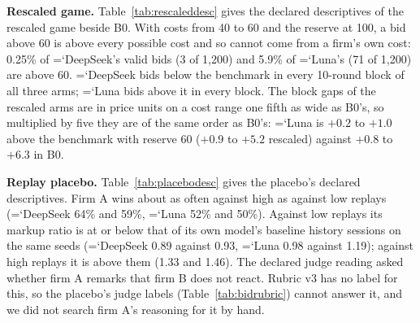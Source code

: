 \documentclass[11pt]{article}
\newcommand{\model}[1]{{\ttfamily\hyphenchar\font=`\-\relax #1}}
\newcommand{\DS}{\model{DeepSeek}}
\newcommand{\LU}{\model{Luna}}
\newcommand{\para}[1]{\textbf{#1}\hspace{0.4em}}
\begin{document}
\para{Rescaled game.} Table~\ref{tab:rescaleddesc} gives the declared descriptives of the rescaled game beside \textcolor{cB}{B0}. With costs from 40 to 60 and the reserve at 100, a bid above 60 is above every possible cost and so cannot come from a firm's own cost: 0.25\% of \DS's valid bids (3 of 1{,}200) and 5.9\% of \LU's (71 of 1{,}200) are above 60. \DS{} bids below the benchmark in every 10-round block of all three arms; \LU{} bids above it in every block. The block gaps of the rescaled arms are in price units on a cost range one fifth as wide as \textcolor{cB}{B0}'s, so multiplied by five they are of the same order as \textcolor{cB}{B0}'s: \LU{} is $+0.2$ to $+1.0$ above the benchmark with reserve 60 ($+0.9$ to $+5.2$ rescaled) against $+0.8$ to $+6.3$ in \textcolor{cB}{B0}.

\begin{table}[t]
\centering\small
\caption{Declared descriptives of the rescaled game beside \textcolor{cB}{B0} (means over 12 sessions). \textbf{$>$60 \%}: \% of valid bids above 60 (reserve-100 arm only); \textbf{Gap}: mean distance of bids from the benchmark bid, in price units; \textbf{Reserve \%}, \textbf{Below cost \%}: \% of bids at the reserve and below cost; \textbf{Ties \%}: \% of rounds with tied lowest bids; then the mean bid minus the benchmark bid by 10-round block. Price units in the rescaled arms are on a cost range of 20, against 100 in \textcolor{cB}{B0}.}
\label{tab:rescaleddesc}
\setlength{\tabcolsep}{3.5pt}
\end{table}

\para{Replay placebo.} Table~\ref{tab:placebodesc} gives the placebo's declared descriptives. Firm A wins about as often against high as against low replays (\DS{} 64\% and 59\%, \LU{} 52\% and 50\%). Against low replays its markup ratio is at or below that of its own model's baseline history sessions on the same seeds (\DS{} 0.89 against 0.93, \LU{} 0.98 against 1.19); against high replays it is above them (1.33 and 1.46). The declared judge reading asked whether firm A remarks that firm B does not react. Rubric v3 has no label for this, so the placebo's judge labels (Table~\ref{tab:bidrubric}) cannot answer it, and we did not search firm A's reasoning for it by hand.
\end{document}
